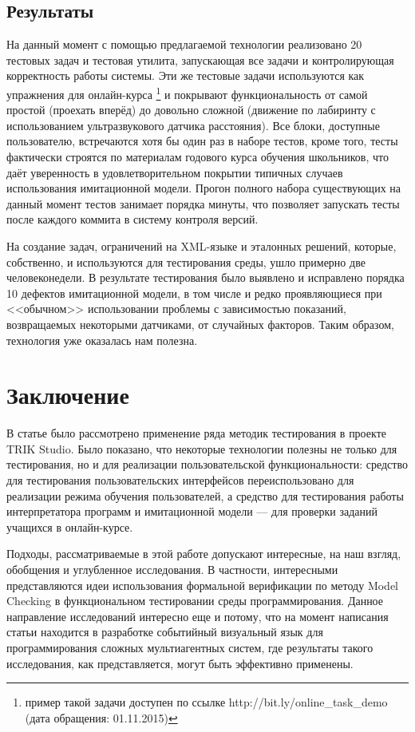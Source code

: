 \documentclass[conference]{IEEEtran}
\begin{document}
\subsection{Результаты}
На данный момент с помощью предлагаемой технологии реализовано 20 тестовых задач и
тестовая утилита, запускающая все задачи и контролирующая корректность работы системы.
Эти же тестовые задачи используются как упражнения для онлайн-курса%
\footnote{пример такой задачи доступен по ссылке http://bit.ly/online\_task\_demo (дата обращения: 01.11.2015)}
и покрывают функциональность от самой простой (проехать вперёд) до довольно сложной
(движение по лабиринту с использованием ультразвукового датчика расстояния). Все блоки,
доступные пользователю, встречаются хотя бы один раз в наборе тестов, кроме того, тесты фактически 
строятся по материалам годового курса обучения школьников, что даёт уверенность в
удовлетворительном покрытии типичных случаев использования имитационной модели. Прогон
полного набора существующих на данный момент тестов занимает порядка минуты, что позволяет запускать
тесты после каждого коммита в систему контроля версий.

На создание задач, ограничений на XML-языке и эталонных решений, которые, собственно,
и используются для тестирования среды, ушло примерно две человеконедели. В результате
тестирования было выявлено и исправлено порядка 10 дефектов имитационной модели, в том числе
и редко проявляющиеся при <<обычном>> использовании проблемы с зависимостью показаний,
возвращаемых некоторыми датчиками, от случайных факторов. Таким образом, технология 
уже оказалась нам полезна.

\section{Заключение}
В статье было рассмотрено применение ряда методик тестирования в проекте TRIK Studio. Было показано, что 
некоторые технологии полезны не только для тестирования, но и для реализации пользовательской функциональности: 
средство для тестирования пользовательских интерфейсов переиспользовано для реализации режима обучения пользователей, а 
средство для тестирования работы интерпретатора программ и имитационной модели --- для проверки заданий учащихся в онлайн-курсе.

Подходы, рассматриваемые в этой работе допускают интересные, на наш взгляд, обобщения и углубленное исследования.
В частности, интересными представляются идеи использования формальной верификации по методу Model Checking в 
функциональном тестировании среды программирования. Данное направление исследований интересно еще и потому, что на момент 
написания статьи находится в разработке событийный визуальный язык для программирования сложных мультиагентных 
систем, где результаты такого исследования, как представляется, могут быть эффективно применены.



\end{document}
